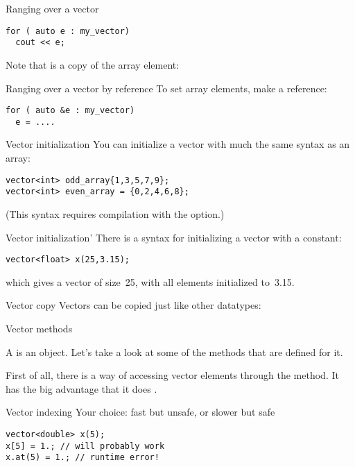 \begin{block}{Ranging over a vector}
  \label{sl:vector-range}
\begin{verbatim}
for ( auto e : my_vector)
  cout << e;
\end{verbatim}
Note that  is a copy of the array element:
\end{block}

\begin{block}{Ranging over a vector by reference}
  \label{sl:vector-range-ref}
To set array elements, make  a reference:
\begin{verbatim}
for ( auto &e : my_vector)
  e = ....
\end{verbatim}
\end{block}

\begin{block}{Vector initialization}
  \label{sl:vector-init}
  You can initialize a vector with much the same syntax as an array:
\begin{verbatim}
vector<int> odd_array{1,3,5,7,9};
vector<int> even_array = {0,2,4,6,8};
\end{verbatim}
(This syntax requires compilation with the 
option.)
\end{block}

\begin{block}{Vector initialization'}
  \label{sl:vector-initconst}
  There is a syntax for initializing a vector with a constant:
\begin{verbatim}
vector<float> x(25,3.15);
\end{verbatim}
which gives a vector of size~25, with all elements initialized to~3.15.
\end{block}

\begin{block}{Vector copy}
  \label{sl:vectorcopy}
  Vectors can be copied just like other datatypes:
\end{block}

 {Vector methods}

A  is an object. Let's take a look at some of the methods
that are defined for it.

First of all, there is a way of accessing vector elements through the
 method. It has the big advantage that it does
.
\begin{block}{Vector indexing}
  \label{sl:vector-index}
  Your choice:  fast but unsafe, or slower but safe
\begin{verbatim}
vector<double> x(5);
x[5] = 1.; // will probably work
x.at(5) = 1.; // runtime error!
\end{verbatim}
\end{block}

